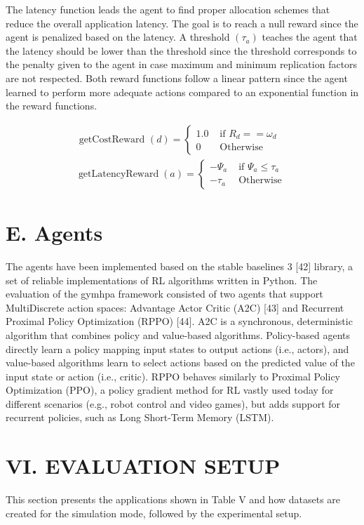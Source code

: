 \documentclass[10pt]{article}
\begin{document}
The latency function leads the agent to find proper allocation schemes that reduce the overall application latency. The goal is to reach a null reward since the agent is penalized based on the latency. A threshold $\left(\tau_{a}\right)$ teaches the agent that the latency should be lower than the threshold since the threshold corresponds to the penalty given to the agent in case maximum and minimum replication factors are not respected. Both reward functions follow a linear pattern since the agent learned to perform more adequate actions compared to an exponential function in the reward functions.


\begin{gather*}
\text { getCostReward }(d)= \begin{cases}1.0 & \text { if } R_{d}==\omega_{d} \\
0 & \text { Otherwise }\end{cases}  \tag{5}\\
\operatorname{getLatencyReward}(a)= \begin{cases}-\Psi_{a} & \text { if } \Psi_{a} \leq \tau_{a} \\
-\tau_{a} & \text { Otherwise }\end{cases} \tag{6}
\end{gather*}


\section*{E. Agents}
The agents have been implemented based on the stable baselines 3 [42] library, a set of reliable implementations of RL algorithms written in Python. The evaluation of the gymhpa framework consisted of two agents that support MultiDiscrete action spaces: Advantage Actor Critic (A2C) [43] and Recurrent Proximal Policy Optimization (RPPO) [44]. A2C is a synchronous, deterministic algorithm that combines policy and value-based algorithms. Policy-based agents directly learn a policy mapping input states to output actions (i.e., actors), and value-based algorithms learn to select actions based on the predicted value of the input state or action (i.e., critic). RPPO behaves similarly to Proximal Policy Optimization (PPO), a policy gradient method for RL vastly used today for different scenarios (e.g., robot control and video games), but adds support for recurrent policies, such as Long Short-Term Memory (LSTM).

\section*{VI. EVALUATION SETUP}
This section presents the applications shown in Table V and how datasets are created for the simulation mode, followed by the experimental setup.
\end{document}
